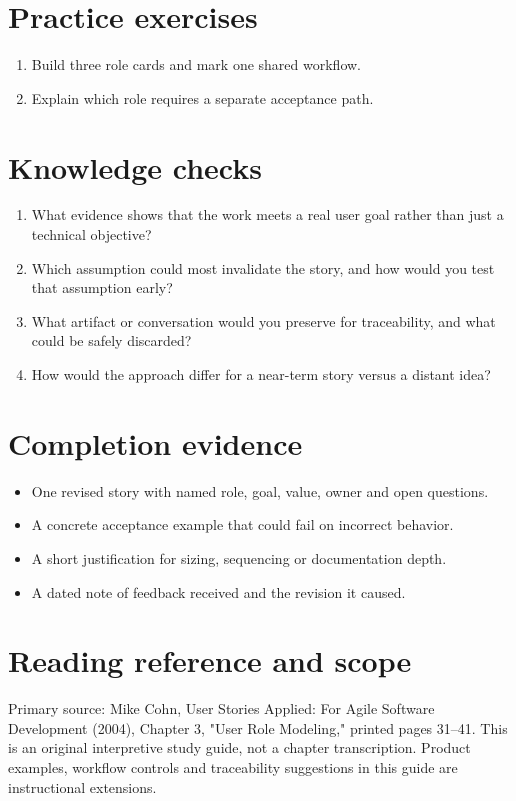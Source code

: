 \documentclass[11pt,letterpaper]{article}
\begin{document}
\section{Practice exercises}
\begin{enumerate}[leftmargin=*,itemsep=3pt]
\item Build three role cards and mark one shared workflow.
\item Explain which role requires a separate acceptance path.
\end{enumerate}
\section{Knowledge checks}
\begin{enumerate}[leftmargin=*,itemsep=3pt]
\item What evidence shows that the work meets a real user goal rather than just a technical objective?
\item Which assumption could most invalidate the story, and how would you test that assumption early?
\item What artifact or conversation would you preserve for traceability, and what could be safely discarded?
\item How would the approach differ for a near-term story versus a distant idea?
\end{enumerate}
\section{Completion evidence}
\begin{itemize}[leftmargin=*,itemsep=2pt]
\item One revised story with named role, goal, value, owner and open questions.
\item A concrete acceptance example that could fail on incorrect behavior.
\item A short justification for sizing, sequencing or documentation depth.
\item A dated note of feedback received and the revision it caused.
\end{itemize}
\section{Reading reference and scope}
Primary source: Mike Cohn, User Stories Applied: For Agile Software Development (2004), Chapter 3, "User Role Modeling," printed pages 31–41. This is an original interpretive study guide, not a chapter transcription. Product examples, workflow controls and traceability suggestions in this guide are instructional extensions.
\end{document}
